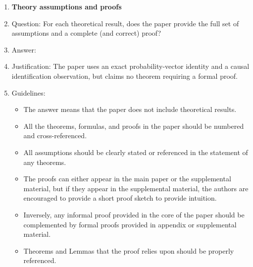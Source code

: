 \documentclass[
]{article}
\begin{document}
\begin{enumerate}
\begin{itemize}
        \item If applicable, the authors should discuss possible limitations of their approach to address problems of privacy and fairness.
        \item While the authors might fear that complete honesty about limitations might be used by reviewers as grounds for rejection, a worse outcome might be that reviewers discover limitations that aren't acknowledged in the paper. The authors should use their best judgment and recognize that individual actions in favor of transparency play an important role in developing norms that preserve the integrity of the community. Reviewers will be specifically instructed to not penalize honesty concerning limitations.
    \end{itemize}

\item {\bf Theory assumptions and proofs}
    \item[] Question: For each theoretical result, does the paper provide the full set of assumptions and a complete (and correct) proof?
    \item[] Answer: \answerNA{} %
    \item[] Justification: The paper uses an exact probability-vector identity and a causal identification observation, but claims no theorem requiring a formal proof.
    \item[] Guidelines:
    \begin{itemize}
        \item The answer \answerNA{} means that the paper does not include theoretical results. 
        \item All the theorems, formulas, and proofs in the paper should be numbered and cross-referenced.
        \item All assumptions should be clearly stated or referenced in the statement of any theorems.
        \item The proofs can either appear in the main paper or the supplemental material, but if they appear in the supplemental material, the authors are encouraged to provide a short proof sketch to provide intuition. 
        \item Inversely, any informal proof provided in the core of the paper should be complemented by formal proofs provided in appendix or supplemental material.
        \item Theorems and Lemmas that the proof relies upon should be properly referenced. 
    \end{itemize}


\end{enumerate}
\end{document}
